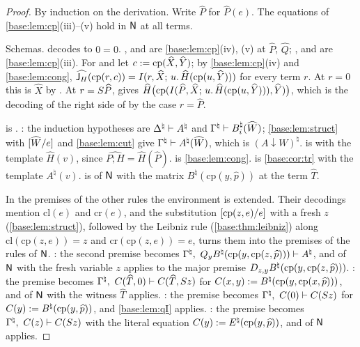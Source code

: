 \begin{proof}
By induction on the derivation.  Write $\widehat P$ for $\widehat P(e)$.
The equations of \cref{base:lem:cp}(iii)--(v) hold in $\mathsf{N}$ at all terms.

Schemas.   decodes to $0=0$.  ,  and
 are \cref{base:lem:cp}(iv), (v) at $\widehat P$, $\widehat Q$;
,  and  are \cref{base:lem:cp}(iii).
For  and  let $c\mathrel{:=}\mathrm{cp}(\widehat X,\widehat Y)$;
by \cref{base:lem:cp}(iv) and \cref{base:lem:cong},
$\widehat{\mathsf J_H}(\mathrm{cp}(r,c))=
I(r,\widehat X;\,u.\,\widehat H(\mathrm{cp}(u,\widehat Y)))$ for every term
$r$.  At $r=0$ this is $\widehat X$ by .  At
$r=S\widehat P$,  gives
$\widehat H\bigl(\mathrm{cp}(I(\widehat P,\widehat X;\,u.\,\widehat H(\mathrm{cp}(u,\widehat Y))),\widehat Y)\bigr)$,
which is the decoding of the right side of  by the case
$r=\widehat P$.

 is .  : the induction hypotheses
are $\Delta^\natural\vdash A^\natural$ and
$\Gamma^\natural\vdash B_i^\natural(\widehat W)$;
\cref{base:lem:struct} with $[\widehat W/e]$ and \cref{base:lem:cut}
give $\Gamma^\natural\vdash A^\natural(\widehat W)$, which is
$(A{\downarrow}W)^\natural$.   is  with the
template $\widehat H(v)$, since $\widehat{P;H}=\widehat H(\widehat P)$.
 is \cref{base:lem:cong}.   is
\cref{base:cor:tr} with the template $A^\natural(v)$.   is
 of $\mathsf{N}$ with the matrix $B^\natural(\mathrm{cp}(y,\widehat p))$
at the term $\widehat T$.

In the premises of the other rules the environment is extended.  Their
decodings mention $\mathrm{cl}(e)$ and $\mathrm{cr}(e)$, and the
substitution $[\mathrm{cp}(z,e)/e]$ with a fresh $z$
(\cref{base:lem:struct}), followed by the Leibniz rule
(\cref{base:thm:leibniz}) along $\mathrm{cl}(\mathrm{cp}(z,e))=z$ and
$\mathrm{cr}(\mathrm{cp}(z,e))=e$, turns them into the premises of the rules
of $\mathsf{N}$.  : the second premise becomes
$\Gamma^\natural,\ \Q{y}B^\natural(\mathrm{cp}(y,\mathrm{cp}(z,\widehat p)))
\proves A^\natural$, and  of $\mathsf{N}$ with the fresh variable $z$
applies to the major premise
$D_{z,y}B^\natural(\mathrm{cp}(y,\mathrm{cp}(z,\widehat p)))$.
: the premise becomes
$\Gamma^\natural,\ C(\widehat T,0)\vdash C(\widehat T,S z)$ for
$C(x,y)\mathrel{:=} B^\natural(\mathrm{cp}(y,\mathrm{cp}(x,\widehat p)))$, and
 of $\mathsf{N}$ with the witness $\widehat T$ applies.
: the premise becomes
$\Gamma^\natural,\ C(0)\vdash C(S z)$ for
$C(y)\mathrel{:=} B^\natural(\mathrm{cp}(y,\widehat p))$, and
\cref{base:lem:qI} applies.  : the premise becomes
$\Gamma^\natural,\ C(z)\vdash C(S z)$ with the literal equation
$C(y)\mathrel{:=} E^\natural(\mathrm{cp}(y,\widehat p))$, and  of
$\mathsf{N}$ applies.
\end{proof}

